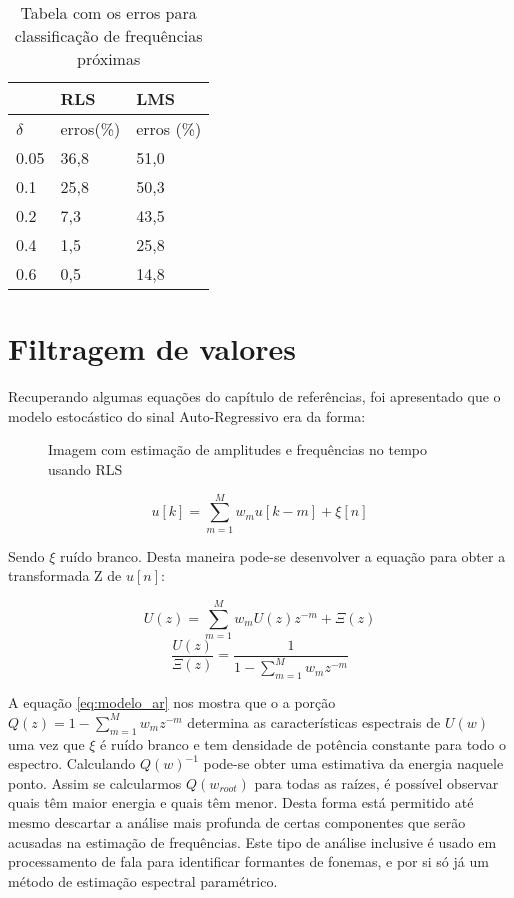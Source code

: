 \begin{table}[h]
	\centering
\begin{tabular}{|l|l|l|}
	\hline
	& RLS   & LMS        \\ \hline
	$\delta$ & erros(\%) & erros (\%) \\ \hline
	0.05  & 36,8  & 51,0       \\ \hline
	0.1   & 25,8  & 50,3       \\ \hline
	0.2   & 7,3   & 43,5       \\ \hline
	0.4   & 1,5   & 25,8       \\ \hline
	0.6   & 0,5   & 14,8       \\ \hline
	\end{tabular}
\caption{Tabela com os erros para classificação de frequências próximas}
\label{tab:tab_freq}
\end{table}

\section{Filtragem de valores}

Recuperando algumas equações do capítulo de referências, foi apresentado que o modelo estocástico do sinal Auto-Regressivo era da forma:

\begin{figure}[H]
	\centering    
	\def\svgwidth{\columnwidth}
	
	\caption{Imagem com estimação de amplitudes e frequências no tempo usando RLS}
	\label{fig:im_RLS}
\end{figure}

\begin{equation}
u[k]=\sum_{m=1}^{M}w_m u[k-m] +\xi[n]
\end{equation}

Sendo $\xi$ ruído branco. Desta maneira pode-se desenvolver a equação para obter a transformada Z de $u[n]$:

\begin{equation}
U(z)=\sum_{m=1}^{M}w_m U(z)z^{-m} +\Xi(z)
\end{equation}
\begin{equation}
\frac{U(z)}{\Xi(z)}=\frac{1}{1-\sum_{m=1}^{M}w_m z^{-m}}
\label{eq:modelo_ar}
\end{equation}


A equação \ref{eq:modelo_ar} nos mostra que o a porção $Q(z)=1-\sum_{m=1}^{M}w_m z^{-m}$ determina as características espectrais de $U(w)$ uma vez que $\xi$ é ruído branco e tem densidade de potência constante para todo o espectro. Calculando $Q(w)^{-1}$ pode-se obter uma estimativa da energia naquele ponto. Assim se calcularmos $Q(w_{root})$ para todas  as raízes, é possível observar quais têm maior energia e quais têm menor. Desta forma está permitido até mesmo descartar a análise mais profunda de certas componentes que serão acusadas na estimação de frequências. Este tipo de análise inclusive é usado em processamento de fala para identificar formantes de fonemas, e por si só já um método de estimação espectral paramétrico.

